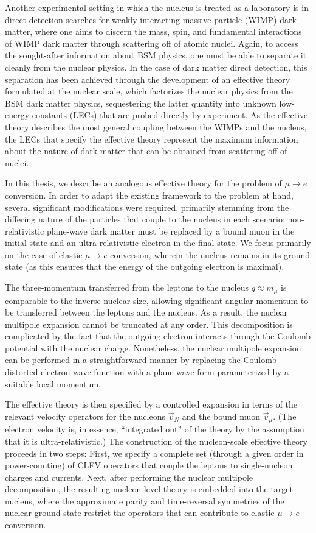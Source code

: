 \documentclass[12pt,letterpaper]{book}
\begin{document}
Another experimental setting in which the nucleus is treated as a laboratory is in direct detection searches for weakly-interacting massive particle (WIMP) dark matter, where one aims to discern the mass, spin, and fundamental interactions of WIMP dark matter through scattering off of atomic nuclei. Again, to access the sought-after information about BSM physics, one must be able to separate it cleanly from the nuclear physics. In the case of dark matter direct detection, this separation has been achieved through the development of an effective theory formulated at the nuclear scale, which factorizes the nuclear physics from the BSM dark matter physics, sequestering the latter quantity into unknown low-energy constants (LECs) that are probed directly by experiment. As the effective theory describes the most general coupling between the WIMPs and the nucleus, the LECs that specify the effective theory represent the maximum information about the nature of dark matter that can be obtained from scattering off of nuclei. 

In this thesis, we describe an analogous effective theory for the problem of $\mu\rightarrow e$ conversion. In order to adapt the existing framework to the problem at hand, several significant modifications were required, primarily stemming from the differing nature of the particles that couple to the nucleus in each scenario: non-relativistic plane-wave dark matter must be replaced by a bound muon in the initial state and an ultra-relativistic electron in the final state. We focus primarily on the case of elastic $\mu\rightarrow e$ conversion, wherein the nucleus remains in its ground state (as this ensures that the energy of the outgoing electron is maximal).  

The three-momentum transferred from the leptons to the nucleus $q\approx m_{\mu}$ is comparable to the inverse nuclear size, allowing significant angular momentum to be transferred between the leptons and the nucleus. As a result, the nuclear multipole expansion cannot be truncated at any order. This decomposition is complicated by the fact that the outgoing electron interacts through the Coulomb potential with the nuclear charge. Nonetheless, the nuclear multipole expansion can be performed in a straightforward manner by replacing the Coulomb-distorted electron wave function with a plane wave form parameterized by a suitable local momentum.

The effective theory is then specified by a controlled expansion in terms of the relevant velocity operators for the nucleons $\vec{v}_N$ and the bound muon $\vec{v}_{\mu}$. (The electron velocity is, in essence, ``integrated out'' of the theory by the assumption that it is ultra-relativistic.) The construction of the nucleon-scale effective theory proceeds in two steps: First, we specify a complete set (through a given order in power-counting) of CLFV operators that couple the leptons to single-nucleon charges and currents. Next, after performing the nuclear multipole decomposition, the resulting nucleon-level theory is embedded into the target nucleus, where the approximate parity and time-reversal symmetries of the nuclear ground state restrict the operators that can contribute to elastic $\mu\rightarrow e$ conversion. 
\end{document}
